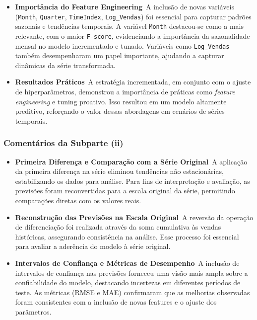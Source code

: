 \documentclass[a4paper, 12pt]{article}
\begin{document}
\begin{itemize} \item \textbf{Importância do Feature Engineering}\ A inclusão de novas variáveis (\texttt{Month}, \texttt{Quarter}, \texttt{TimeIndex}, \texttt{Log\_Vendas}) foi essencial para capturar padrões sazonais e tendências temporais. A variável \texttt{Month} destacou-se como a mais relevante, com o maior \texttt{F-score}, evidenciando a importância da sazonalidade mensal no modelo incrementado e tunado. Variáveis como \texttt{Log\_Vendas} também desempenharam um papel importante, ajudando a capturar dinâmicas da série transformada. \end{itemize}

\begin{itemize} \item \textbf{Resultados Práticos}\ A estratégia incrementada, em conjunto com o ajuste de hiperparâmetros, demonstrou a importância de práticas como \textit{feature engineering} e tuning proativo. Isso resultou em um modelo altamente preditivo, reforçando o valor dessas abordagens em cenários de séries temporais. \end{itemize}



\subsubsection{Comentários da Subparte (ii)}

\begin{itemize} \item \textbf{Primeira Diferença e Comparação com a Série Original}\ A aplicação da primeira diferença na série eliminou tendências não estacionárias, estabilizando os dados para análise. Para fins de interpretação e avaliação, as previsões foram reconvertidas para a escala original da série, permitindo comparações diretas com os valores reais. \end{itemize}

\begin{itemize} \item \textbf{Reconstrução das Previsões na Escala Original}\ A reversão da operação de diferenciação foi realizada através da soma cumulativa às vendas históricas, assegurando consistência na análise. Esse processo foi essencial para avaliar a aderência do modelo à série original. \end{itemize}

\begin{itemize} \item \textbf{Intervalos de Confiança e Métricas de Desempenho}\ A inclusão de intervalos de confiança nas previsões forneceu uma visão mais ampla sobre a confiabilidade do modelo, destacando incertezas em diferentes períodos de teste. As métricas (RMSE e MAE) confirmaram que as melhorias observadas foram consistentes com a inclusão de novas features e o ajuste dos parâmetros. \end{itemize}
\end{document}
